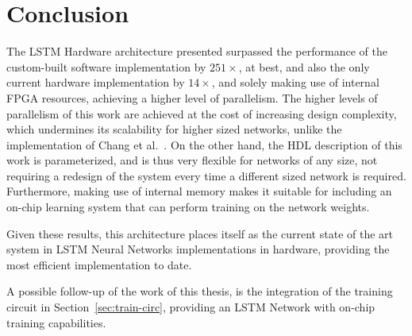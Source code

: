 \chapter{Conclusion}\label{chap:conclusion}
The LSTM Hardware architecture presented surpassed the performance of the custom-built software implementation by $251\times$, at best,
and also the only current hardware implementation by $14\times$, and solely making use of internal FPGA
resources, achieving a higher level of parallelism. The higher levels of parallelism of this work are achieved at the cost of increasing
design complexity, which undermines its scalability for higher sized networks, unlike the implementation of Chang et al.~\cite{Chang15}.
On the other hand, the HDL description of this work is parameterized, and is thus very flexible for networks of any size, not requiring
a redesign of the system every time a different sized network is required. Furthermore, making use of internal memory makes it suitable
for including an on-chip learning system that can perform training on the network weights.

Given these results, this architecture places itself as the current state of the art system in LSTM Neural Networks
implementations in hardware, providing the most efficient implementation to date.

A possible follow-up of the work of this thesis, is the integration of the training circuit in Section~\ref{sec:train-circ}, providing
an LSTM Network with on-chip training capabilities.
